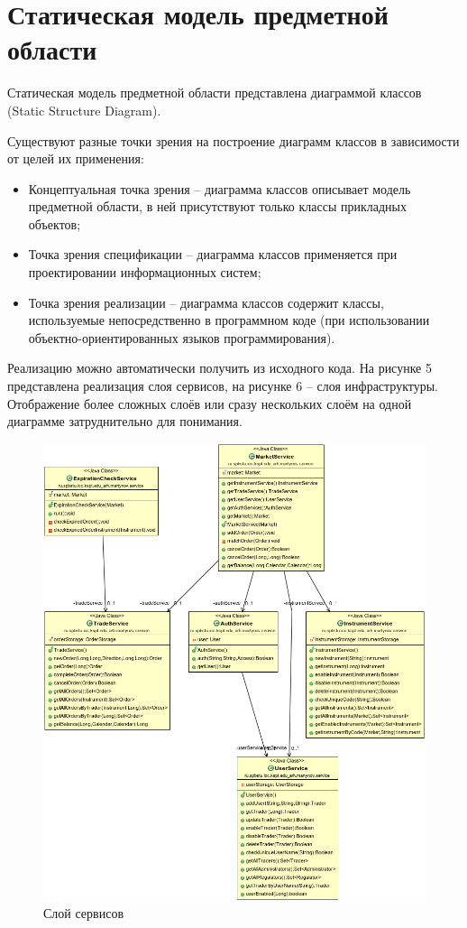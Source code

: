 \documentclass[a4paper, 12pt]{article}        %
\begin{document}
\newpage
\section{Статическая модель предметной области}

Статическая модель предметной области представлена диаграммой классов (Static Structure Diagram).

Существуют разные точки зрения на построение диаграмм классов в зависимости от целей их применения:
\begin{itemize}
\item Концептуальная точка зрения -- диаграмма классов описывает модель предметной области, в ней присутствуют только классы прикладных объектов;
\item Точка зрения спецификации -- диаграмма классов применяется при проектировании информационных систем;
\item Точка зрения реализации -- диаграмма классов содержит классы, используемые непосредственно в программном коде (при использовании объектно-ориентированных языков программирования).
\end{itemize}

Реализацию можно автоматически получить из исходного кода. На рисунке 5 представлена реализация слоя сервисов, на рисунке 6 -- слоя инфраструктуры. Отображение более сложных слоёв или сразу нескольких слоём на одной диаграмме затруднительно для понимания.

\begin{figure}[H]
\centering
\includegraphics[scale=0.6]{res/pic05}
\caption{Слой сервисов}
\end{figure}
\end{document}
